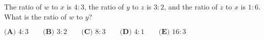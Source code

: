 The ratio of $w$ to $x$ is $4 : 3$, the ratio of $y$ to $z$ is $3 : 2$, and the ratio of $z$ to $x$ is $1 : 6$. What is the ratio of $w$ to $y$?

$\textbf{(A) }4:3 \qquad \textbf{(B) }3:2 \qquad \textbf{(C) } 8:3 \qquad \textbf{(D) } 4:1 \qquad \textbf{(E) } 16:3 $